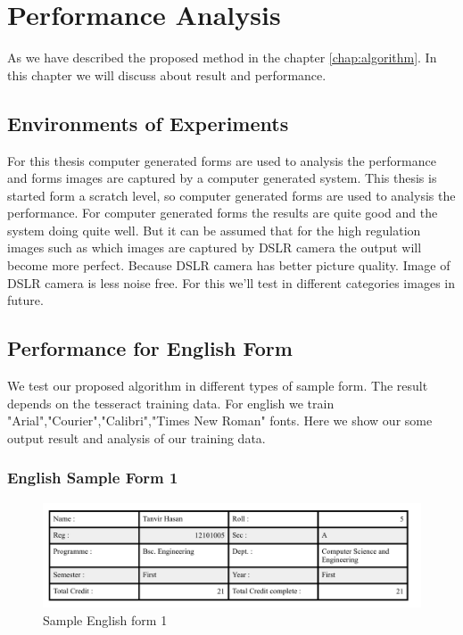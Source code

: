 \chapter {Performance Analysis}
\label{chap:result}
As we have described the proposed method in the chapter \ref{chap:algorithm}. In this chapter we will discuss about result and performance.
\section{Environments of Experiments}
For this thesis computer generated forms are used to analysis the performance and forms images are captured by a computer generated system. This thesis is started form a scratch level, so computer generated forms are used to analysis the performance. For computer generated forms the results are quite good and the system doing quite well. But it can be assumed that for the high regulation images such as which images are captured by DSLR camera the output will become more perfect. Because DSLR camera has better picture quality. Image of DSLR camera is less noise free. For this we’ll test in different categories images in future.  
   
\section{Performance for English Form}
We test our proposed algorithm in different types of sample form. The result depends on the tesseract training data. For english we train "Arial","Courier","Calibri","Times New Roman" fonts. Here we show our some output result and analysis of our training data.
\subsection{English Sample Form 1}

\begin{figure}[H]
\centering
\includegraphics[width=1\textwidth]{form1.png}
\caption {Sample English form 1}
\label {fig:form1}
\end{figure}

